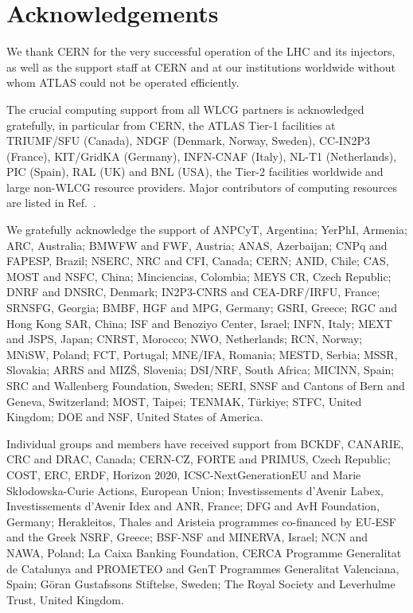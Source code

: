 \documentclass[PAPER, atlasdraft=true, UKenglish, coverpage]{atlasdoc}
\begin{document}
\section*{Acknowledgements}



We thank CERN for the very successful operation of the LHC and its injectors, as well as the support staff at
CERN and at our institutions worldwide without whom ATLAS could not be operated efficiently.

The crucial computing support from all WLCG partners is acknowledged gratefully, in particular from CERN, the ATLAS Tier-1 facilities at TRIUMF/SFU (Canada), NDGF (Denmark, Norway, Sweden), CC-IN2P3 (France), KIT/GridKA (Germany), INFN-CNAF (Italy), NL-T1 (Netherlands), PIC (Spain), RAL (UK) and BNL (USA), the Tier-2 facilities worldwide and large non-WLCG resource providers. Major contributors of computing resources are listed in Ref.~\cite{ATL-SOFT-PUB-2023-001}.

We gratefully acknowledge the support of ANPCyT, Argentina; YerPhI, Armenia; ARC, Australia; BMWFW and FWF, Austria; ANAS, Azerbaijan; CNPq and FAPESP, Brazil; NSERC, NRC and CFI, Canada; CERN; ANID, Chile; CAS, MOST and NSFC, China; Minciencias, Colombia; MEYS CR, Czech Republic; DNRF and DNSRC, Denmark; IN2P3-CNRS and CEA-DRF/IRFU, France; SRNSFG, Georgia; BMBF, HGF and MPG, Germany; GSRI, Greece; RGC and Hong Kong SAR, China; ISF and Benoziyo Center, Israel; INFN, Italy; MEXT and JSPS, Japan; CNRST, Morocco; NWO, Netherlands; RCN, Norway; MNiSW, Poland; FCT, Portugal; MNE/IFA, Romania; MESTD, Serbia; MSSR, Slovakia; ARRS and MIZ\v{S}, Slovenia; DSI/NRF, South Africa; MICINN, Spain; SRC and Wallenberg Foundation, Sweden; SERI, SNSF and Cantons of Bern and Geneva, Switzerland; MOST, Taipei; TENMAK, T\"urkiye; STFC, United Kingdom; DOE and NSF, United States of America.

Individual groups and members have received support from BCKDF, CANARIE, CRC and DRAC, Canada; CERN-CZ, FORTE and PRIMUS, Czech Republic; COST, ERC, ERDF, Horizon 2020, ICSC-NextGenerationEU and Marie Sk{\l}odowska-Curie Actions, European Union; Investissements d'Avenir Labex, Investissements d'Avenir Idex and ANR, France; DFG and AvH Foundation, Germany; Herakleitos, Thales and Aristeia programmes co-financed by EU-ESF and the Greek NSRF, Greece; BSF-NSF and MINERVA, Israel; NCN and NAWA, Poland; La Caixa Banking Foundation, CERCA Programme Generalitat de Catalunya and PROMETEO and GenT Programmes Generalitat Valenciana, Spain; G\"{o}ran Gustafssons Stiftelse, Sweden; The Royal Society and Leverhulme Trust, United Kingdom.
\end{document}

